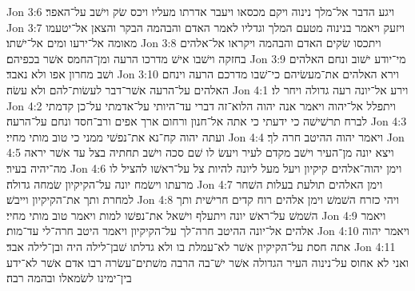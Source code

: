 Jon 3:6  ויגע הדבר אל־מלך נינוה ויקם מכסאו ויעבר אדרתו מעליו ויכס שׂק וישׁב על־האפר׃
Jon 3:7  ויזעק ויאמר בנינוה מטעם המלך וגדליו לאמר האדם והבהמה הבקר והצאן אל־יטעמו מאומה אל־ירעו ומים אל־ישׁתו׃
Jon 3:8  ויתכסו שׂקים האדם והבהמה ויקראו אל־אלהים בחזקה וישׁבו אישׁ מדרכו הרעה ומן־החמס אשׁר בכפיהם׃
Jon 3:9  מי־יודע ישׁוב ונחם האלהים ושׁב מחרון אפו ולא נאבד׃
Jon 3:10  וירא האלהים את־מעשׂיהם כי־שׁבו מדרכם הרעה וינחם האלהים על־הרעה אשׁר־דבר לעשׂות־להם ולא עשׂה׃
Jon 4:1  וירע אל־יונה רעה גדולה ויחר לו׃
Jon 4:2  ויתפלל אל־יהוה ויאמר אנה יהוה הלוא־זה דברי עד־היותי על־אדמתי על־כן קדמתי לברח תרשׁישׁה כי ידעתי כי אתה אל־חנון ורחום ארך אפים ורב־חסד ונחם על־הרעה׃
Jon 4:3  ועתה יהוה קח־נא את־נפשׁי ממני כי טוב מותי מחיי׃
Jon 4:4  ויאמר יהוה ההיטב חרה לך׃
Jon 4:5  ויצא יונה מן־העיר וישׁב מקדם לעיר ויעשׂ לו שׁם סכה וישׁב תחתיה בצל עד אשׁר יראה מה־יהיה בעיר׃
Jon 4:6  וימן יהוה־אלהים קיקיון ויעל מעל ליונה להיות צל על־ראשׁו להציל לו מרעתו וישׂמח יונה על־הקיקיון שׂמחה גדולה׃
Jon 4:7  וימן האלהים תולעת בעלות השׁחר למחרת ותך את־הקיקיון וייבשׁ׃
Jon 4:8  ויהי כזרח השׁמשׁ וימן אלהים רוח קדים חרישׁית ותך השׁמשׁ על־ראשׁ יונה ויתעלף וישׁאל את־נפשׁו למות ויאמר טוב מותי מחיי׃
Jon 4:9  ויאמר אלהים אל־יונה ההיטב חרה־לך על־הקיקיון ויאמר היטב חרה־לי עד־מות׃
Jon 4:10  ויאמר יהוה אתה חסת על־הקיקיון אשׁר לא־עמלת בו ולא גדלתו שׁבן־לילה היה ובן־לילה אבד׃
Jon 4:11  ואני לא אחוס על־נינוה העיר הגדולה אשׁר ישׁ־בה הרבה משׁתים־עשׂרה רבו אדם אשׁר לא־ידע בין־ימינו לשׂמאלו ובהמה רבה׃


